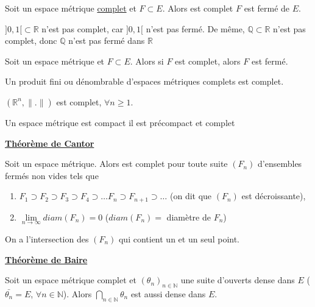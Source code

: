 \documentclass[12pt,a4paper]{article}
\begin{document}
\begin{flushleft}
\begin{thm}
Soit \edm un espace métrique \underline{complet} et $F \subset E$. Alors \fdm est complet \ssi $F$ est fermé de $E$.
\end{thm}

\begin{rem} 
$]0,1[ \subset \mathbb{R}$ n'est pas complet, car $]0,1[$ n'est pas fermé. De même, $\mathbb {Q} \subset \mathbb{R}$ n'est pas complet, donc $\mathbb{Q}$ n'est pas fermé dans $\mathbb{R}$
\end{rem}


\begin{prop} 
Soit \edm un espace métrique et $F \subset E$. Alors si $F$ est complet, alors $F$ est fermé.
\end{prop}

\begin{thm}
Un produit fini ou dénombrable d'espaces métriques complets est complet.
\end{thm}

\begin{cor}
$( \mathbb{R}^n, \lVert . \rVert)$ est complet, $\forall n \geq 1$. 
\end{cor}

\begin{thm}
Un espace métrique \edm est compact \ssi il est précompact et complet
\end{thm}

\underline{\textbf{Théorème de Cantor}}
\begin{thm}
Soit \edm un espace métrique. Alors \edm est complet \ssi pour toute suite $(F_n)$ d'ensembles fermés non vides tels que
\begin{enumerate}
\item $F_1 \supset F_2 \supset F_3 \supset F_4 \supset  \ldots F_n \supset F_{n+1} \supset \ldots$  (on dit que $(F_n)$ est décroissante),
\item $\lim\limits_{n \rightarrow \infty} diam(F_n) = 0$ ($diam(F_n) = $ diamètre de $F_n$)
\end{enumerate}
On a l'intersection des $(F_n)$ qui contient un et un seul point.
\end{thm}

\underline{\textbf{Théorème de Baire}}
\begin{thm}
Soit \edm un espace métrique complet et $(\theta_n)_{n \in \mathbb{N}}$ une suite d'ouverts dense dans $E$ ($\bar{\theta_n} = E$, $\forall n \in \mathbb{N}$). Alors $\bigcap\limits_{n \in \mathbb{N}} \theta_n$ est aussi dense dans $E$.
\end{thm}


\end{flushleft}
\end{document}
